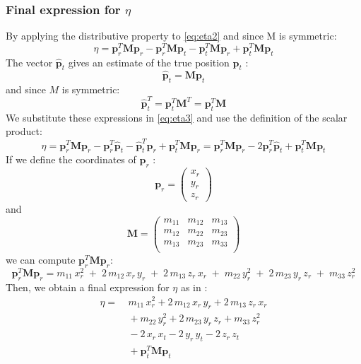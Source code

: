 \subsubsection{Final expression for $\eta$}
By applying the distributive property to \ref{eq:eta2} and since M is symmetric:
\begin{equation}
    \eta = \mathbf{p}_r^T \mathbf{M} \mathbf{p}_r - \mathbf{p}_r^T \mathbf{M} \mathbf{p}_t - \mathbf{p}_t^T \mathbf{M} \mathbf{p}_r+ \mathbf{p}_t^T \mathbf{M} \mathbf{p}_t
    \label{eq:eta3}
\end{equation}
The vector $\mathbf{\hat{p}}_t$ gives an estimate of the true position $\mathbf{p}_t$ :
\[
\mathbf{\hat{p}}_t = \mathbf{M} \mathbf{p}_t
\]
and since $M$ is symmetric:
\[
\mathbf{\hat{p}}_t^T =  \mathbf{p}_t^T \mathbf{M}^T = \mathbf{p}_t^T \mathbf{M}
\]
We substitute these expressions in \ref{eq:eta3} and use the definition of the scalar product:
\[
\eta = \mathbf{p}_r^T \mathbf{M} \mathbf{p}_r - \mathbf{p}_r^T \mathbf{\hat{p}}_t - \mathbf{\hat{p}}_t^T \mathbf{p}_r+ \mathbf{p}_t^T \mathbf{M} \mathbf{p}_r = \mathbf{p}_r^T \mathbf{M} \mathbf{p}_r - 2 \mathbf{p}_r^T \mathbf{\hat{p}}_t + \mathbf{p}_t^T \mathbf{M} \mathbf{p}_t
\]
If we define the coordinates of $\mathbf{p}_r$ :
\[
\mathbf{p}_r = \begin{pmatrix}
    x_r \\
    y_r \\
    z_r
\end{pmatrix}
\]
and
\[
    \mathbf{M} = \begin{pmatrix}
    m_{11} & m_{12} & m_{13} \\
    m_{12} & m_{22} & m_{23} \\
    m_{13} & m_{23} & m_{33} \\
\end{pmatrix}
\]
we can compute $\mathbf{p}_r^T \mathbf{M} \mathbf{p}_r$:
\[
\mathbf{p}_r^T \mathbf{M} \mathbf{p}_r = 
m_{11} \, x_r^2 \; + \; 2 \, m_{12} \, x_r \, y_r \; + \; 2 \, m_{13} \, z_r \, x_r \; + \;
m_{22} \, y_r^2 \; + \; 2 \, m_{23} \, y_r \, z_r \; + \; m_{33} \, z_r^2
\]
Then, we obtain a final expression for $\eta$ as in \cite{main}:
\begin{equation}
\begin{aligned}
\eta = & \ m_{11} \, x_r^2 + 2 \, m_{12} \, x_r \, y_r + 2 \, m_{13} \, z_r \, x_r \\
       & \ + m_{22} \, y_r^2 + 2 \, m_{23} \, y_r \, z_r + m_{33} \, z_r^2 \\
       & \ - 2 \, x_r \, x_t - 2 \, y_r \, y_t - 2 \, z_r \, z_t \\
       & \ + \mathbf{p}_t^T \mathbf{M} \mathbf{p}_t
\end{aligned}
\label{eq:eta_final}
\end{equation}

